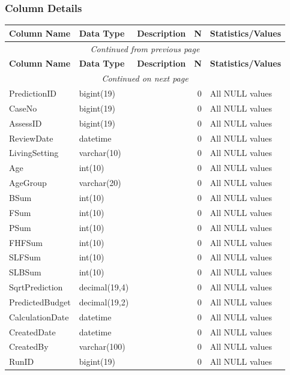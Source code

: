 \begin{landscape}
\subsubsection{Column Details}
\begin{longtable}{|l|l|l|r|p{6cm}|}
\hline
\textbf{Column Name} & \textbf{Data Type} & \textbf{Description} & \textbf{N} & \textbf{Statistics/Values} \\
\hline
\endfirsthead
\multicolumn{5}{c}{\textit{Continued from previous page}} \\
\hline
\textbf{Column Name} & \textbf{Data Type} & \textbf{Description} & \textbf{N} & \textbf{Statistics/Values} \\
\hline
\endhead
\hline
\multicolumn{5}{c}{\textit{Continued on next page}} \\
\endfoot
\hline
\endlastfoot
PredictionID & bigint(19) &  & 0 & All NULL values \\
\hline
CaseNo & bigint(19) &  & 0 & All NULL values \\
\hline
AssessID & bigint(19) &  & 0 & All NULL values \\
\hline
ReviewDate & datetime &  & 0 & All NULL values \\
\hline
LivingSetting & varchar(10) &  & 0 & All NULL values \\
\hline
Age & int(10) &  & 0 & All NULL values \\
\hline
AgeGroup & varchar(20) &  & 0 & All NULL values \\
\hline
BSum & int(10) &  & 0 & All NULL values \\
\hline
FSum & int(10) &  & 0 & All NULL values \\
\hline
PSum & int(10) &  & 0 & All NULL values \\
\hline
FHFSum & int(10) &  & 0 & All NULL values \\
\hline
SLFSum & int(10) &  & 0 & All NULL values \\
\hline
SLBSum & int(10) &  & 0 & All NULL values \\
\hline
SqrtPrediction & decimal(19,4) &  & 0 & All NULL values \\
\hline
PredictedBudget & decimal(19,2) &  & 0 & All NULL values \\
\hline
CalculationDate & datetime &  & 0 & All NULL values \\
\hline
CreatedDate & datetime &  & 0 & All NULL values \\
\hline
CreatedBy & varchar(100) &  & 0 & All NULL values \\
\hline
RunID & bigint(19) &  & 0 & All NULL values \\
\hline
\end{longtable}


\end{landscape}
